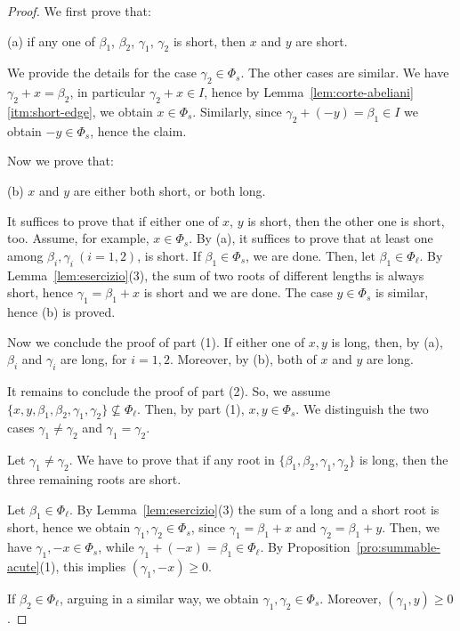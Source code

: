\documentclass[ALCO,published]{cedram}
\theoremstyle{plain}
\newcommand\be{\beta}
\newcommand\ga{\gamma}
\begin{document}
\begin{proof}
We first prove that:

(a) if any one of $\be_1$, $\be_2$, $\ga_1$, $\ga_2$ is short,  then $x$ and $y$ are short.
\par
We provide the details for the case $\ga_2\in \Phi_s$. 
The other cases are similar. 
We have $\ga_2+x=\be_2$, in particular $\ga_2+x\in I$, hence by Lemma~\ref{lem:corte-abeliani}\ref{itm:short-edge}, we obtain $x\in \Phi_s$.
Similarly, since $\ga_2+(-y)=\be_1\in I$ we obtain $-y\in \Phi_s$, hence the claim. 
\par
Now we prove that: 

(b) $x$ and $y$ are either both short, or both long.
\par
It suffices to prove that if either one of $x$, $y$ is short, then the other one is short, too.
Assume, for example, $x\in\Phi_s$. 
By (a), it suffices to prove that at least one among $\be_i,\ga_i\ (i=1,2)$, is short.
If $\be_1\in\Phi_s$, we are done.
Then, let $\be_1\in\Phi_\ell$. 
By Lemma~\ref{lem:esercizio}(3), the sum of two roots of different lengths is always short, hence  $\ga_1=\be_1+x$ is short and we are done.
The case $y\in\Phi_s$ is similar, hence (b) is proved.
\par
Now we conclude the proof of part (1). 
If either one of $x, y$ is long, then, by (a), $\be_i$ and $\ga_i$ are long, for $i=1,2$. 
Moreover, by (b), both of $x$ and $y$ are long. 

\par  
It remains to conclude the proof of part (2). 
So, we assume  $\{x, y, \be_1, \be_2, \ga_1, \ga_2\}\not\subseteq \Phi_\ell$.
Then, by part (1), $x, y\in \Phi_s$. 
We distinguish the two cases  $\ga_1\neq\ga_2$ and $\ga_1=\ga_2$.

\par
Let $\ga_1\neq\ga_2$. 
We have to prove that if any root in $\{\be_1, \be_2, \ga_1, \ga_2\}$ is long, then the  three remaining roots are short.

\par
Let $\be_1\in \Phi_\ell$.
By Lemma~\ref{lem:esercizio}(3) the sum of a long and a short root is short, hence we obtain $\ga_1, \ga_2\in \Phi_s$,  since $\ga_1=\be_1+x$ and  $\ga_2=\be_1+y$.
Then, we have $\ga_1, -x\in \Phi_s$, while $\ga_1+(-x)=\be_1\in \Phi_\ell$. By  Proposition~\ref{pro:summable-acute}(1), this implies $(\ga_1, -x)\geq 0$.

\par
If $\be_2\in \Phi_\ell$, arguing in a similar way, we obtain  
$\ga_1, \ga_2\in \Phi_s$. 
Moreover, $(\ga_1, y)\geq 0$.


\end{proof}
\end{document}
